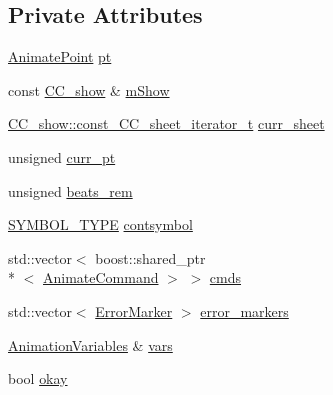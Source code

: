 \subsection*{Private Attributes}
\begin{DoxyCompactItemize}
\item 
\hyperlink{a00196_a91212e6bb797b2b440819b6a9a86f702}{Animate\-Point} \hyperlink{a00007_a452baa7903c665a4861cb1f1eaa9d2df}{pt}
\item 
const \hyperlink{a00046}{C\-C\-\_\-show} \& \hyperlink{a00007_abf4e08c9790e8d8e011de3c2b8120ecd}{m\-Show}
\item 
\hyperlink{a00046_aaaf1345012d2f833d1c8f28f9b8593ff}{C\-C\-\_\-show\-::const\-\_\-\-C\-C\-\_\-sheet\-\_\-iterator\-\_\-t} \hyperlink{a00007_a506679d533380355bf4de8b9f4d8aaa1}{curr\-\_\-sheet}
\item 
unsigned \hyperlink{a00007_a88dedadc61cd7a2dcc08140809e81e0b}{curr\-\_\-pt}
\item 
unsigned \hyperlink{a00007_af3feb682c6ad3aab1c7483d6b3dcd5f0}{beats\-\_\-rem}
\item 
\hyperlink{a00216_a68cd84e0300be6f9ff4474682762c9ee}{S\-Y\-M\-B\-O\-L\-\_\-\-T\-Y\-P\-E} \hyperlink{a00007_aa854b256cdb3fcc21d3a7b110f34bc20}{contsymbol}
\item 
std\-::vector$<$ boost\-::shared\-\_\-ptr\\*
$<$ \hyperlink{a00003}{Animate\-Command} $>$ $>$ \hyperlink{a00007_a5d5b0775236c5ad6382eb58f1e0fc0a9}{cmds}
\item 
std\-::vector$<$ \hyperlink{a00098}{Error\-Marker} $>$ \hyperlink{a00007_a727a78d36a18425535c2d262ee7634b2}{error\-\_\-markers}
\item 
\hyperlink{a00014}{Animation\-Variables} \& \hyperlink{a00007_a5bb5e56e9ad574dc86439a37eb4511c7}{vars}
\item 
bool \hyperlink{a00007_a937c6b3e6577b594848cc98b62915ede}{okay}
\end{DoxyCompactItemize}


